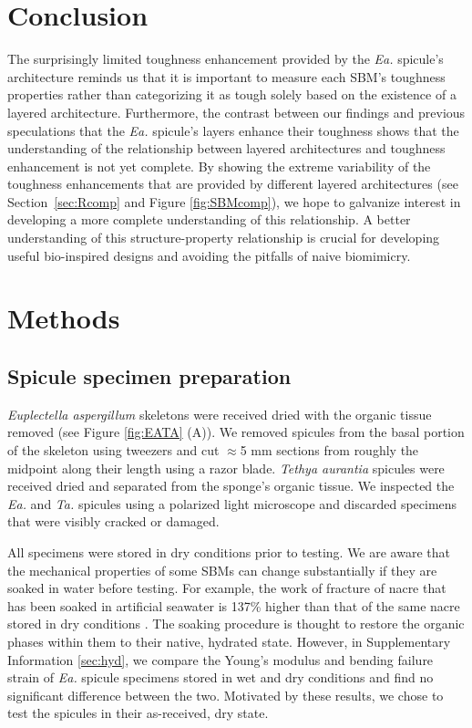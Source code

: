 \documentclass[12pt,onecolumn]{article}
\makeatletter
\newcommand{\TA}{\textit{Ta.\@}\xspace}
\newcommand{\EA}{\textit{Ea.\@}\xspace}
\makeatother
\begin{document}
\begin{bibunit}
\section{Conclusion}
The surprisingly limited toughness enhancement provided by the \EA spicule's architecture reminds us that it is important to measure each SBM's toughness properties rather than categorizing it as tough solely based on the existence of a layered architecture. Furthermore, the contrast between our findings and previous speculations that the \EA spicule's layers enhance their toughness shows that the understanding of the relationship between layered architectures and toughness enhancement is not yet complete. By showing the extreme variability of the toughness enhancements that are provided by different layered architectures (see Section~\ref{sec:Rcomp} and Figure \ref{fig:SBMcomp}), we hope to galvanize interest in developing a more complete understanding of this relationship. A better understanding of this structure-property relationship is crucial for developing useful bio-inspired designs and avoiding the pitfalls of naive biomimicry.

\section{Methods}
\label{sec:methods}

\subsection{Spicule specimen preparation}
\label{sec:sampleprep}
\textit{Euplectella aspergillum} skeletons were received dried with the organic tissue removed (see Figure \ref{fig:EATA} (A)). We removed spicules from the basal portion of the skeleton using tweezers and cut $\approx$5 mm sections from roughly the midpoint along their length using a razor blade. \textit{Tethya aurantia} spicules were received dried and separated from the sponge's organic tissue. We inspected the \EA and \TA spicules using a polarized light microscope and discarded specimens that were visibly cracked or damaged.

All specimens were stored in dry conditions prior to testing. We are aware that the mechanical properties of some SBMs can change substantially if they are soaked in water before testing. For example, the work of fracture of nacre that has been soaked in artificial seawater is 137\% higher than that of the same nacre stored in dry conditions \cite{jackson1988}. The soaking procedure is thought to restore the organic phases within them to their native, hydrated state.  However, in Supplementary Information \ref{sec:hyd}, we compare the Young's modulus and bending failure strain of \EA spicule specimens stored in wet and dry conditions and find no significant difference between the two. Motivated by these results, we chose to test the spicules in their as-received, dry state.


\end{bibunit}
\end{document}
